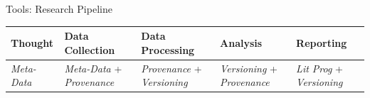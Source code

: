 \documentclass[ignorenonframetext,]{beamer}
\begin{document}
\begin{frame}{Tools: Research Pipeline}
\protect\hypertarget{tools-research-pipeline}{}

\begin{longtable}[]{@{}lllll@{}}
\toprule
\begin{minipage}[b]{0.07\columnwidth}\raggedright
Thought\strut
\end{minipage} & \begin{minipage}[b]{0.18\columnwidth}\raggedright
Data Collection\strut
\end{minipage} & \begin{minipage}[b]{0.20\columnwidth}\raggedright
Data Processing\strut
\end{minipage} & \begin{minipage}[b]{0.23\columnwidth}\raggedright
Analysis\strut
\end{minipage} & \begin{minipage}[b]{0.18\columnwidth}\raggedright
Reporting\strut
\end{minipage}\tabularnewline
\midrule
\endhead
\begin{minipage}[t]{0.07\columnwidth}\raggedright
\emph{Meta-Data}\strut
\end{minipage} & \begin{minipage}[t]{0.18\columnwidth}\raggedright
\emph{Meta-Data} + \emph{Provenance}\strut
\end{minipage} & \begin{minipage}[t]{0.20\columnwidth}\raggedright
\emph{Provenance} + \emph{Versioning}\strut
\end{minipage} & \begin{minipage}[t]{0.23\columnwidth}\raggedright
\emph{Versioning} + \emph{Provenance}\strut
\end{minipage} & \begin{minipage}[t]{0.18\columnwidth}\raggedright
\emph{Lit Prog} + \emph{Versioning}\strut
\end{minipage}\tabularnewline
\bottomrule
\end{longtable}

\end{frame}
\end{document}
